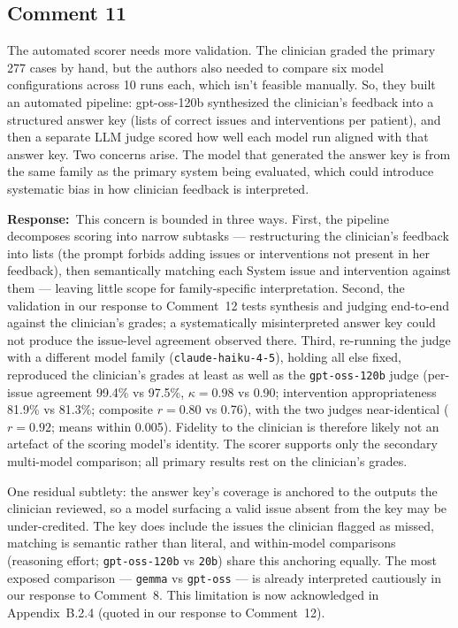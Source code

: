 \documentclass[11pt,a4paper]{article}
\newcounter{rcomment}
\newcommand{\response}{\noindent\textbf{Response:}\ }
\begin{document}
\subsection*{Comment 11}
\begin{reviewercomment}
The automated scorer needs more validation. The clinician graded the primary 277 cases by hand, but the authors also needed to compare six model configurations across 10 runs each, which isn't feasible manually. So, they built an automated pipeline: gpt-oss-120b synthesized the clinician's feedback into a structured answer key (lists of correct issues and interventions per patient), and then a separate LLM judge scored how well each model run aligned with that answer key. Two concerns arise. The model that generated the answer key is from the same family as the primary system being evaluated, which could introduce systematic bias in how clinician feedback is interpreted.
\end{reviewercomment}

\response This concern is bounded in three ways. First, the pipeline decomposes scoring into narrow subtasks --- restructuring the clinician's feedback into lists (the prompt forbids adding issues or interventions not present in her feedback), then semantically matching each System issue and intervention against them --- leaving little scope for family-specific interpretation. Second, the validation in our response to Comment~12 tests synthesis and judging end-to-end against the clinician's grades; a systematically misinterpreted answer key could not produce the issue-level agreement observed there. Third, re-running the judge with a different model family (\texttt{claude-haiku-4-5}), holding all else fixed, reproduced the clinician's grades at least as well as the \texttt{gpt-oss-120b} judge (per-issue agreement 99.4\% vs 97.5\%, $\kappa = 0.98$ vs 0.90; intervention appropriateness 81.9\% vs 81.3\%; composite $r = 0.80$ vs 0.76), with the two judges near-identical ($r = 0.92$; means within 0.005). Fidelity to the clinician is therefore likely not an artefact of the scoring model's identity. The scorer supports only the secondary multi-model comparison; all primary results rest on the clinician's grades.

One residual subtlety: the answer key's coverage is anchored to the outputs the clinician reviewed, so a model surfacing a valid issue absent from the key may be under-credited. The key does include the issues the clinician flagged as missed, matching is semantic rather than literal, and within-model comparisons (reasoning effort; \texttt{gpt-oss-120b} vs \texttt{20b}) share this anchoring equally. The most exposed comparison --- \texttt{gemma} vs \texttt{gpt-oss} --- is already interpreted cautiously in our response to Comment~8. This limitation is now acknowledged in Appendix~B.2.4 (quoted in our response to Comment~12).
\end{document}

